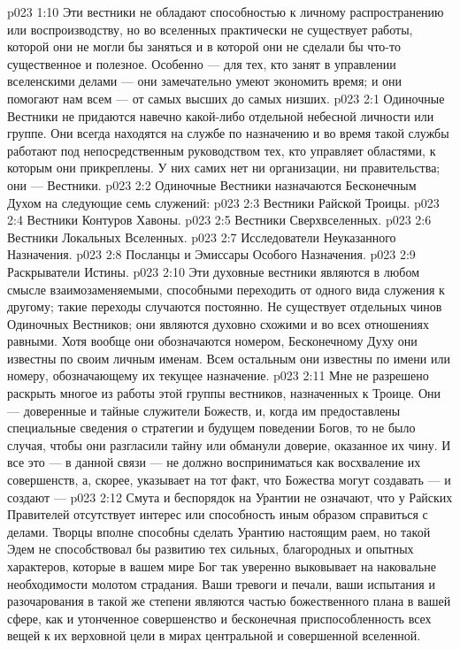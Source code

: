 \vs p023 1:10 \pc Эти вестники не обладают способностью к личному распространению или воспроизводству, но во вселенных практически не существует работы, которой они не могли бы заняться и в которой они не сделали бы что\hyp{}то существенное и полезное. Особенно --- для тех, кто занят в управлении вселенскими делами --- они замечательно умеют экономить время; и они помогают нам всем --- от самых высших до самых низших.
\vs p023 2:1 Одиночные Вестники не придаются навечно какой\hyp{}либо отдельной небесной личности или группе. Они всегда находятся на службе по назначению и во время такой службы работают под непосредственным руководством тех, кто управляет областями, к которым они прикреплены. У них самих нет ни организации, ни правительства; они ---  Вестники.
\vs p023 2:2 \pc Одиночные Вестники назначаются Бесконечным Духом на следующие семь служений:
\vs p023 2:3 \bibnobreakspace Вестники Райской Троицы.
\vs p023 2:4 \bibnobreakspace Вестники Контуров Хавоны.
\vs p023 2:5 \bibnobreakspace Вестники Сверхвселенных.
\vs p023 2:6 \bibnobreakspace Вестники Локальных Вселенных.
\vs p023 2:7 \bibnobreakspace Исследователи Неуказанного Назначения.
\vs p023 2:8 \bibnobreakspace Посланцы и Эмиссары Особого Назначения.
\vs p023 2:9 \bibnobreakspace Раскрыватели Истины.
\vs p023 2:10 \pc Эти духовные вестники являются в любом смысле взаимозаменяемыми, способными переходить от одного вида служения к другому; такие переходы случаются постоянно. Не существует отдельных чинов Одиночных Вестников; они являются духовно схожими и во всех отношениях равными. Хотя вообще они обозначаются номером, Бесконечному Духу они известны по своим личным именам. Всем остальным они известны по имени или номеру, обозначающему их текущее назначение.
\vs p023 2:11 \pc {}\bibnobreakspace {} Мне не разрешено раскрыть многое из работы этой группы вестников, назначенных к Троице. Они --- доверенные и тайные служители Божеств, и, когда им предоставлены специальные сведения о стратегии и будущем поведении Богов, то не было случая, чтобы они разгласили тайну или обманули доверие, оказанное их чину. И все это --- в данной связи --- не должно восприниматься как восхваление их совершенств, а, скорее, указывает на тот факт, что Божества могут создавать --- и создают --- 
\vs p023 2:12 Смута и беспорядок на Урантии не означают, что у Райских Правителей отсутствует интерес или способность иным образом справиться с делами. Творцы вполне способны сделать Урантию настоящим раем, но такой Эдем не способствовал бы развитию тех сильных, благородных и опытных характеров, которые в вашем мире Бог так уверенно выковывает на наковальне необходимости молотом страдания. Ваши тревоги и печали, ваши испытания и разочарования в такой же степени являются частью божественного плана в вашей сфере, как и утонченное совершенство и бесконечная приспособленность всех вещей к их верховной цели в мирах центральной и совершенной вселенной.
